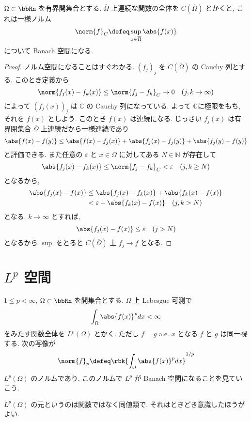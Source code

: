 \documentclass[openany, a4paper, oneside]{jsbook}
\begin{document}
\begin{ex}
$\Omega \subset \bbRn$ を有界開集合とする.
$\overline{\Omega}$ 上連続な関数の全体を $C(\overline{\Omega})$ とかくと,
これは一様ノルム
\begin{align}
 \norm{f}_C
 \defeq
 \sup_{x \in \overline{\Omega}} \abs{f(x)}
\end{align}
について Banach 空間になる.
\begin{proof}
ノルム空間になることはすぐわかる.
$(f_j)_j$ を $C(\overline{\Omega})$ の Cauchy 列とする.
このとき定義から
\begin{align}
 \norm{f_j(x) - f_k(x)}
 \leq
 \norm{f_j - f_k}_C \to 0 \quad (j, k \to \infty)
\end{align}
によって $(f_j(x))_j$ は $\mathbb{C}$ の Cauchy 列になっている.
よって $\mathbb{C}$に極限をもち, それを $f(x)$ としよう.
このとき $f(x)$ は連続になる.
じっさい $f_j(x)$ は有界閉集合 $\overline{\Omega}$ 上連続だから一様連続であり
\begin{align}
 \abs{f(x) - f(y)}
 \leq
 \abs{f(x) - f_j(x)} + \abs{f_j(x) - f_j(y)} + \abs{f_j(y) - f(y)}
\end{align}
と評価できる.
また任意の $\varepsilon$ と $x \in \overline{\Omega}$ に対してある $N\in \mathbb{N}$ が存在して
\begin{align}
 \abs{f_j (x) - f_k(x)}
 \leq
 \norm{f_j - f_k}_C
 <
 \varepsilon \quad (j, k \geq N)
\end{align}
となるから,
\begin{align}
 \abs{f_j(x) - f(x)}
 &\leq
 \abs{f_j(x) - f_k(x)} + \abs{f_k(x) - f(x)} \\
 &<
 \varepsilon + \abs{f_k(x) - f(x)} \quad (j, k > N)
\end{align}
となる.
$k \to \infty$ とすれば,
\begin{align}
 \abs{f_j(x) - f(x)}
 \leq
 \varepsilon \quad (j > N)
\end{align}
となるから $\sup$ をとると $C(\overline{\Omega})$ 上 $f_j \to f$ となる.
\end{proof}
\end{ex}
\section{$L^p$ 空間}

\begin{defn}
$1 \le p < \infty$, $\Omega \subset \bbRn$ を開集合とする.
$\Omega$ 上 Lebesgue 可測で
\begin{align}
 \int_{\Omega} \abs{f(x)}^p dx
 <
 \infty
\end{align}
をみたす関数全体を $L^p(\Omega)$ とかく.
ただし $f = g$ a.e. $x$ となる $f$ と $g$ は同一視する.
次の写像が
\begin{align}
 \norm{f}_p
 \defeq
 \rbk{\int_{\Omega} \abs{f(x)}^p dx}^{1/p}
\end{align}
$L^p (\Omega)$ のノルムであり, このノルムで $L^p$ が Banach 空間になることを見ていこう.
\end{defn}
\begin{rem}
$L^p(\Omega)$ の元というのは関数ではなく同値類で, それはときどき意識したほうがよい.
\end{rem}
\end{document}
